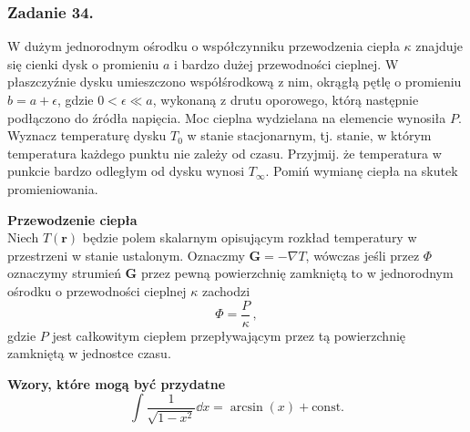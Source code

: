\documentclass[a4paper, twocolumn]{article}
\begin{document}
\subsubsection*{Zadanie 34.}
W dużym jednorodnym ośrodku o współczynniku przewodzenia ciepła \(\kappa\) znajduje się cienki dysk o promieniu \(a\) i bardzo dużej przewodności cieplnej. W płaszczyźnie dysku umieszczono współśrodkową z nim, okrągłą pętlę o promieniu \(b=a+\epsilon\), gdzie \(0<\epsilon\ll a\), wykonaną z drutu oporowego, którą następnie podłączono do źródła napięcia. Moc cieplna wydzielana na elemencie wynosiła \(P\). Wyznacz temperaturę dysku \(T_0\) w stanie stacjonarnym, tj. stanie, w którym temperatura każdego punktu nie zależy od czasu. Przyjmij. że temperatura w punkcie bardzo odległym od dysku wynosi \(T_\infty\). Pomiń wymianę ciepła na skutek promieniowania.
\medskip

\textbf{Przewodzenie ciepła}\\
Niech \(T(\mathbf{r})\) będzie polem skalarnym opisującym rozkład temperatury w przestrzeni w stanie ustalonym. Oznaczmy \(\mathbf{G}=-\nabla T\), wówczas jeśli przez \(\Phi\) oznaczymy strumień \(\mathbf{G}\) przez pewną powierzchnię zamkniętą to w jednorodnym ośrodku o przewodności cieplnej \(\kappa\) zachodzi
\begin{equation*}
    \Phi=\frac{P}{\kappa}\,,
\end{equation*}
gdzie \(P\) jest całkowitym ciepłem przepływającym przez tą powierzchnię zamkniętą w jednostce czasu.
\medskip

\textbf{Wzory, które mogą być przydatne}
\begin{equation*}
    \int \frac{1}{\sqrt{1-x^2}}\dd{x}=\arcsin(x)+\text{const.}
\end{equation*}
\end{document}
